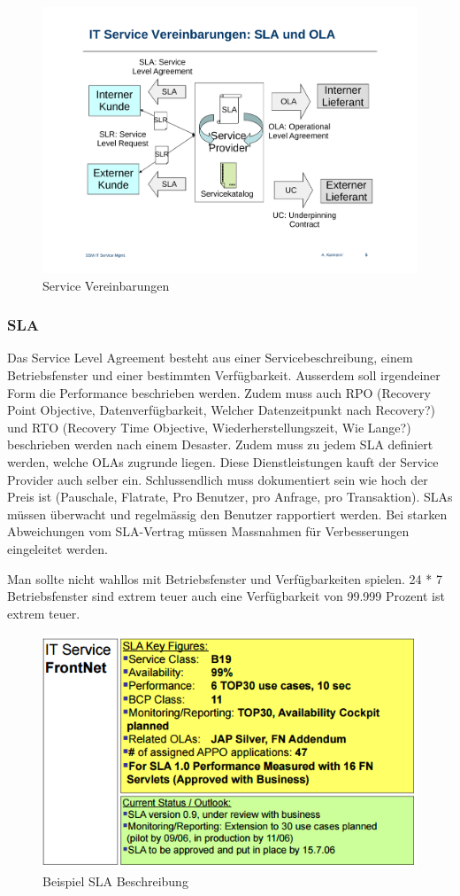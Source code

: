 \begin{figure}[h!]
\centering
\includegraphics[width=0.7\linewidth]{fig/it-service-mgmt-service-vereinbarungen}
\caption{Service Vereinbarungen}
\label{fig:it-service-mgmt-service-vereinbarungen}
\end{figure}

\subsubsection{SLA}
Das Service Level Agreement besteht aus einer Servicebeschreibung, einem Betriebsfenster und einer bestimmten Verfügbarkeit. Ausserdem soll irgendeiner Form die Performance beschrieben werden. Zudem muss auch RPO (Recovery Point Objective, Datenverfügbarkeit, Welcher Datenzeitpunkt nach Recovery?) und RTO (Recovery Time Objective, Wiederherstellungszeit, Wie Lange?) beschrieben werden nach einem Desaster.
Zudem muss zu jedem SLA definiert werden, welche OLAs zugrunde liegen. Diese Dienstleistungen kauft der Service Provider auch selber ein. Schlussendlich muss dokumentiert sein wie hoch der Preis ist (Pauschale, Flatrate, Pro Benutzer, pro Anfrage, pro Transaktion).
SLAs müssen überwacht und regelmässig den Benutzer rapportiert werden. Bei starken Abweichungen vom SLA-Vertrag müssen Massnahmen für Verbesserungen eingeleitet werden.

Man sollte nicht wahllos mit Betriebsfenster und Verfügbarkeiten spielen. 24 * 7 Betriebsfenster sind extrem teuer auch eine Verfügbarkeit von 99.999 Prozent ist extrem teuer.

\begin{figure}[h!]
\centering
\includegraphics[width=0.7\linewidth]{fig/beispiel-sla}
\caption{Beispiel SLA Beschreibung}
\label{fig:beispiel-sla}
\end{figure}

